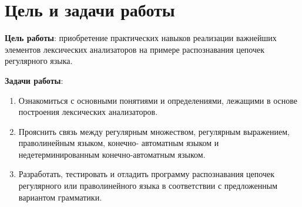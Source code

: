 \chapter{Цель и задачи работы}

\textbf{Цель работы}: приобретение практических навыков реализации важнейших элементов лексических анализаторов
на примере распознавания цепочек регулярного языка.

\textbf{Задачи работы}:
\begin{enumerate}
\item Ознакомиться с основными понятиями и определениями, лежащими в основе построения лексических
анализаторов.
\item Прояснить связь между регулярным множеством, регулярным выражением, праволинейным языком, конечно-
автоматным языком и недетерминированным конечно-автоматным языком.
\item Разработать, тестировать и отладить программу распознавания цепочек регулярного или праволинейного
языка в соответствии с предложенным вариантом грамматики.
\end{enumerate}
